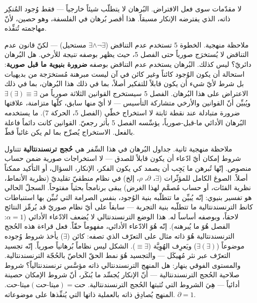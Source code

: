 \documentclass[10pt, openany, oneside]{book}
\begin{document}
\vspace{0.8em}

\noindent لا مقدّمات سوى فعل الافتراض. البُرهان لا يتطلّب شيئاً خارجياً --- فقط وُجود المُنكِر ذاته، الذي يفترضه الإنكار مسبقاً. هذا أقصر بُرهان في الفلسفة، وهو حصين، لأنّ مهاجمته تُنفِّذه.

ملاحظة منهجية. الخطوة 5 تستخدم عدم التناقض ($\exists \wedge \neg\exists$ مستحيل) --- لكنّ قانون عدم التناقض لا يُستخرَج صورياً حتى الفصل 5، حيث يظهر بوصفه \textit{نتيجة} للأرخي. هل البُرهان دائريّ؟ ليس كذلك. البُرهان يستخدم عدم التناقض بوصفه \textbf{ضرورة بنيوية ما قبل صورية}: استحالة أن يكون الوُجود كائناً وغير كائن في آن ليست مبرهنة مُستخرَجة من بديهيات بل شرط لأيّ شيء أن يكون قابلاً للتفكير أصلاً، بما في ذلك هذا البُرهان، بما في ذلك الاعتراض على هذا البُرهان. الفصل 5 سيستخرج القوانين الثلاثة صورياً من $\exists(\exists) \equiv \exists$ ويُبيِّن أنّ القوانين والأرخي متشاركة التأسيس --- لا أيّ منها سابق، كلّها متزامنة، علاقتها ضرورة متبادلة عند نقطة ثابتة لا استخراج خطّي (الفصل 5، الحركة 7). ما يستخدمه البُرهان الأدائي ما-قبل-صورياً، يؤسِّسه الفصل 5 بأثر رجعيّ. القوانين كانت دائماً فاعلة بالفعل. الاستخراج يُصرِّح بما لم يكن غائباً قطّ.

ملاحظة منهجية ثانية. جداول البُرهان في هذا السِّفر هي \textbf{حُجج ترنسندنتالية} تتناول شروط إمكان أيّ ادّعاء أن يكون قابلاً للصدق --- لا استخراجات صورية ضمن حساب منصوص. إنّها تُبرهن ما يَجِب أن يصمد كي يكون الفكر، الإنكار، السؤال، أو التأكيد ممكناً أصلاً. الصوغ الكامل للمؤثّرات ($\exists$، $\partial$، $\rho$، إلخ) في نظام منطقيّ تقليديّ (نظرية الأنماط، نظرية الفئات، أو حساب مُصمَّم لهذا الغرض) يبقى برنامجاً بحثياً مفتوحاً. السجلّ الحالي هو تفسير بنيوي: إنّه يُبيِّن ما تتطلّبه بنية الوُجود، بنفس الصرامة التي تُبيِّن بها استنباطات كانط الترنسندنتالية ما تتطلّبه بنية التجربة --- سابقاً على أيّ نظام صوريّ قد يُرمِّز النتائج لاحقاً، وبوصفه أساساً له. هذا الوضع الترنسندنتالي لا يُضعف الادّعاء الأدائي ($\alpha = 1$: الفصل هُوَ ما يُبرهنه). إنّه هُوَ الادّعاء الأدائي، مفهوماً حقّاً. فعل قراءة هذه الحُجج الترنسندنتالية هُوَ ذاته مثال على التعرّف الذي تصفه: كائن ($\exists$) يأخذ شروط وُجوده موضوعاً ($\exists(\exists)$) ويَعرِف الهُوِيَّة ($\equiv \exists$). الشكل ليس نظاماً بُرهانياً صورياً. إنّه تجسيد التعرّف عبر نثر مُهيكَل --- والتجسيد هُوَ نمط الحقّ الخاصّ بالحُجّة الترنسندنتالية. والمستوى الفوقي ينهار: هل المنهج الترنسندنتالي ذاته مؤسَّس ترنسندنتالياً؟ شروط صلاحية الحُجج الترنسندنتالية --- أنّ الإنكار يُجسِّد ما يُنكَر، أنّ شروط الإمكان حصينة أدائياً --- هِيَ الشروط التي تُثبتها الحُجج الترنسندنتالية. $\text{ميتا-حت}(\text{ميتا-حت}) = \text{حت}$. المنهج يُصادِق ذاته بالعملية ذاتها التي يُنفِّذها على موضوعاته. $\partial = 1$.
\end{document}
